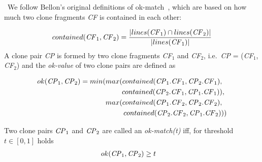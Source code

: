 \documentclass[10pt,journal,compsoc]{IEEEtran}
\newcommand{\squeezeup}{\vspace{-0.5mm}}
\begin{document}
\ We follow Bellon's original definitions of ok-match~\cite{Bellon2007}, which are based on how much two clone
fragments \textit{CF} is contained in each other:

\begin{displaymath}
contained(\textrm{\textit{CF}}_1, \textrm{\textit{CF}}_2) = \frac{|lines(\textrm{\textit{CF}}_1) \cap lines(\textrm{\textit{CF}}_2)|}{|lines(\textrm{\textit{CF}}_1)|}
\end{displaymath}
\noindent%
A clone pair \textit{CP} is formed by two clone fragments
\textit{CF$_1$} and \textit{CF$_2$}, i.e.~\textit{CP} =
(\textit{CF$_1$}, \textit{CF$_2$})
and the \textit{ok-value} of two clone pairs are defined as

\begin{align*}
ok(\textrm{\textit{CP}}_1,\textrm{\textit{CP}}_2) = min(max(contained(\textrm{\textit{CP}}_1.\textrm{\textit{CF}}_1,\textrm{\textit{CP}}_2.\textrm{\textit{CF}}_1),~~ \\ contained(\textrm{\textit{CP}}_2.\textrm{\textit{CF}}_1,\textrm{\textit{CP}}_1.\textrm{\textit{CF}}_1)),~
\\ max(contained(\textrm{\textit{CP}}_1.\textrm{\textit{CF}}_2,\textrm{\textit{CP}}_2.\textrm{\textit{CF}}_2),~~ \\contained(\textrm{\textit{CP}}_2.\textrm{\textit{CF}}_2,\textrm{\textit{CP}}_1.\textrm{\textit{CF}}_2)))
\end{align*}

\noindent%
Two clone pairs $\textrm{\textit{CP}}_1$ and $\textrm{\textit{CP}}_2$
are called an \textit{ok-match(t)}  iff, for threshold $t \in [0,1]$ holds 
\begin{align*}
ok(\textrm{\textit{CP}}_1,\textrm{\textit{CP}}_2) & \geq t
\end{align*}
\end{document}
